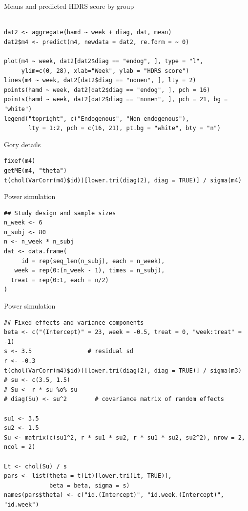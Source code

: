 \documentclass[aspectratio=169]{beamer}
\begin{document}

\begin{frame}[fragile]{Means and predicted HDRS score by group}
  \begin{lstlisting}

dat2 <- aggregate(hamd ~ week + diag, dat, mean)
dat2$m4 <- predict(m4, newdata = dat2, re.form = ~ 0)

plot(m4 ~ week, dat2[dat2$diag == "endog", ], type = "l",
     ylim=c(0, 28), xlab="Week", ylab = "HDRS score")
lines(m4 ~ week, dat2[dat2$diag == "nonen", ], lty = 2)
points(hamd ~ week, dat2[dat2$diag == "endog", ], pch = 16)
points(hamd ~ week, dat2[dat2$diag == "nonen", ], pch = 21, bg = "white")
legend("topright", c("Endogenous", "Non endogenous"),
       lty = 1:2, pch = c(16, 21), pt.bg = "white", bty = "n")

  \end{lstlisting}
\end{frame}

\begin{frame}[fragile]{Gory details}
  \begin{lstlisting}
fixef(m4)
getME(m4, "theta")
t(chol(VarCorr(m4)$id))[lower.tri(diag(2), diag = TRUE)] / sigma(m4)
  \end{lstlisting}
\end{frame}

\begin{frame}[fragile]{Power simulation}
  \begin{lstlisting}
## Study design and sample sizes
n_week <- 6
n_subj <- 80
n <- n_week * n_subj
dat <- data.frame(
     id = rep(seq_len(n_subj), each = n_week),
   week = rep(0:(n_week - 1), times = n_subj),
  treat = rep(0:1, each = n/2)
)
  \end{lstlisting}
\end{frame}

\begin{frame}[fragile]{Power simulation}
  \begin{lstlisting}
## Fixed effects and variance components
beta <- c("(Intercept)" = 23, week = -0.5, treat = 0, "week:treat" = -1)
s <- 3.5                # residual sd
r <- -0.3
t(chol(VarCorr(m4)$id))[lower.tri(diag(2), diag = TRUE)] / sigma(m3)
# su <- c(3.5, 1.5)
# Su <- r * su %o% su
# diag(Su) <- su^2        # covariance matrix of random effects

su1 <- 3.5
su2 <- 1.5
Su <- matrix(c(su1^2, r * su1 * su2, r * su1 * su2, su2^2), nrow = 2, ncol = 2)

Lt <- chol(Su) / s
pars <- list(theta = t(Lt)[lower.tri(Lt, TRUE)],
             beta = beta, sigma = s)
names(pars$theta) <- c("id.(Intercept)", "id.week.(Intercept)", "id.week")
  \end{lstlisting}
\end{frame}
\end{document}

